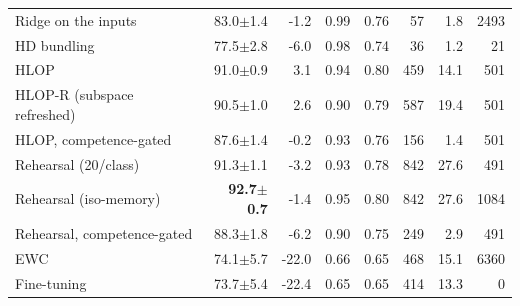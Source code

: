 \begin{tabular}{lrrrrrrr}
Ridge on the inputs & 83.0{\tiny$\pm$1.4} & -1.2 & 0.99 & 0.76 & 57 & 1.8 & 2493 \\
HD bundling & 77.5{\tiny$\pm$2.8} & -6.0 & 0.98 & 0.74 & 36 & 1.2 & 21 \\
HLOP & 91.0{\tiny$\pm$0.9} & 3.1 & 0.94 & 0.80 & 459 & 14.1 & 501 \\
HLOP-R (subspace refreshed) & 90.5{\tiny$\pm$1.0} & 2.6 & 0.90 & 0.79 & 587 & 19.4 & 501 \\
HLOP, competence-gated & 87.6{\tiny$\pm$1.4} & -0.2 & 0.93 & 0.76 & 156 & 1.4 & 501 \\
Rehearsal (20/class) & 91.3{\tiny$\pm$1.1} & -3.2 & 0.93 & 0.78 & 842 & 27.6 & 491 \\
Rehearsal (iso-memory) & \textbf{92.7{\tiny$\pm$0.7}} & -1.4 & 0.95 & 0.80 & 842 & 27.6 & 1084 \\
Rehearsal, competence-gated & 88.3{\tiny$\pm$1.8} & -6.2 & 0.90 & 0.75 & 249 & 2.9 & 491 \\
EWC & 74.1{\tiny$\pm$5.7} & -22.0 & 0.66 & 0.65 & 468 & 15.1 & 6360 \\
Fine-tuning & 73.7{\tiny$\pm$5.4} & -22.4 & 0.65 & 0.65 & 414 & 13.3 & 0 \\
\bottomrule
\end{tabular}
